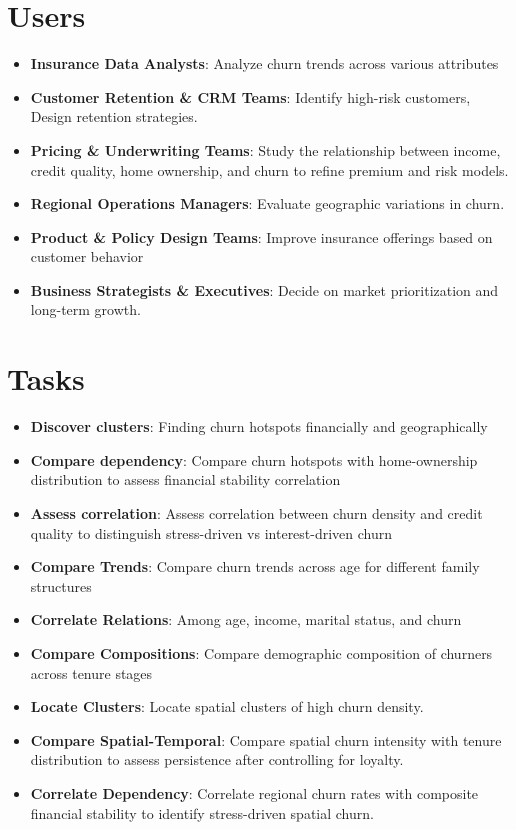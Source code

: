 \documentclass[10pt,a4paper]{article}
\begin{document}
\section*{Users}
\begin{itemize}[itemsep=1pt]
    \item \textbf{Insurance Data Analysts}: Analyze churn trends across various attributes
    \item \textbf{Customer Retention \& CRM Teams}: Identify high-risk customers, Design retention strategies.
    \item \textbf{Pricing \& Underwriting Teams}: Study the relationship between income, credit quality, home ownership, and churn to refine premium and risk models.
    \item \textbf{Regional Operations Managers}: Evaluate geographic variations in churn.
    \item \textbf{Product \& Policy Design Teams}: Improve insurance offerings based on customer behavior
    \item \textbf{Business Strategists \& Executives}: Decide on market prioritization and long-term growth.
\end{itemize}

\section*{Tasks}
\begin{itemize}[itemsep=1pt]
    \item \textbf{Discover clusters}: Finding churn hotspots financially and geographically
    \item \textbf{Compare dependency}: Compare churn hotspots with home-ownership distribution to assess financial stability correlation
    \item \textbf{Assess correlation}: Assess correlation between churn density and credit quality to distinguish stress-driven vs interest-driven churn
    \item \textbf{Compare Trends}: Compare churn trends across age for different family structures
    \item \textbf{Correlate Relations}: Among age, income, marital status, and churn
    \item \textbf{Compare Compositions}: Compare demographic composition of churners across tenure stages
    \item \textbf{Locate Clusters}: Locate spatial clusters of high churn density.
    \item \textbf{Compare Spatial-Temporal}: Compare spatial churn intensity with tenure distribution to assess persistence after controlling for loyalty.
    \item \textbf{Correlate Dependency}: Correlate regional churn rates with composite financial stability to identify stress-driven spatial churn.
\end{itemize}
\end{document}
